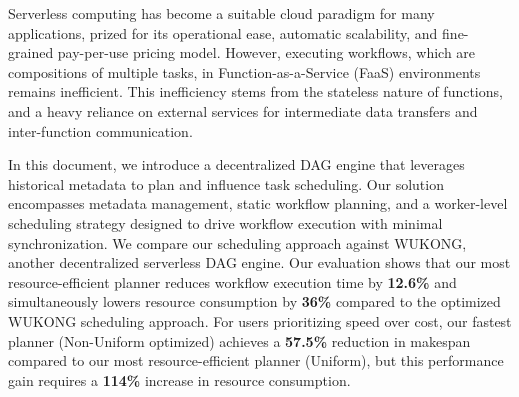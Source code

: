 \acresetall
\noindent Serverless computing has become a suitable cloud paradigm for many applications, prized for its operational ease, automatic scalability, and fine-grained pay-per-use pricing model. However, executing workflows, which are compositions of multiple tasks, in Function-as-a-Service (FaaS) environments remains inefficient. This inefficiency stems from the stateless nature of functions, and a heavy reliance on external services for intermediate data transfers and inter-function communication.

In this document, we introduce a decentralized DAG engine that leverages historical metadata to plan and influence task scheduling. Our solution encompasses metadata management, static workflow planning, and a worker-level scheduling strategy designed to drive workflow execution with minimal synchronization. We compare our scheduling approach against WUKONG, another decentralized serverless DAG engine. Our evaluation shows that our most resource-efficient planner reduces workflow execution time by \textbf{12.6\%} and simultaneously lowers resource consumption by \textbf{36\%} compared to the optimized WUKONG scheduling approach. For users prioritizing speed over cost, our fastest planner (Non-Uniform optimized) achieves a \textbf{57.5\%} reduction in makespan compared to our most resource-efficient planner (Uniform), but this performance gain requires a \textbf{114\%} increase in resource consumption.